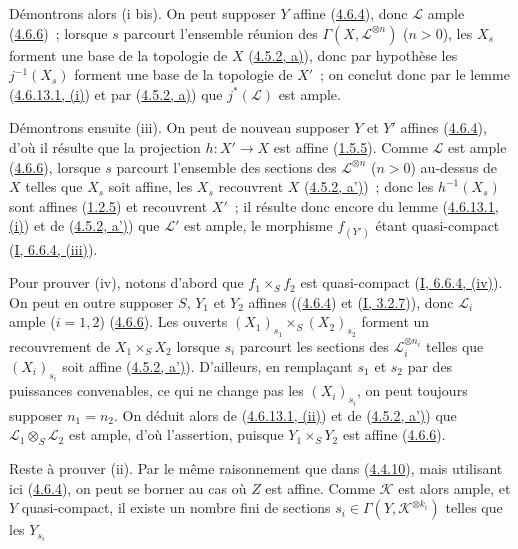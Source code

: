 Démontrons alors (i bis). On peut supposer $Y$ affine
(\hyperref[II.4.6.4-fr]{4.6.4}), donc $\mathcal{L}$ ample
(\hyperref[II.4.6.6-fr]{4.6.6})~; lorsque $s$ parcourt l'ensemble réunion
des $\Gamma(X,\mathcal{L}^{\otimes n})$ ($n>0$), les $X_s$ forment une
base de la topologie de $X$ (\hyperref[II.4.5.2-fr]{4.5.2, a)}), donc par
hypothèse les $j^{-1}(X_s)$ forment une base de la topologie de $X'$~; on
conclut donc par le lemme
(\hyperref[II.4.6.13.1-fr]{4.6.13.1, (i)}) et par
(\hyperref[II.4.5.2-fr]{4.5.2, a)}) que $j^*(\mathcal{L})$ est ample.

Démontrons ensuite (iii). On peut de nouveau supposer $Y$ et $Y'$ affines
(\hyperref[II.4.6.4-fr]{4.6.4}), d'où il résulte que la projection
$h:X'\to X$ est affine (\hyperref[II.1.5.5-fr]{1.5.5}). Comme
$\mathcal{L}$ est ample (\hyperref[II.4.6.6-fr]{4.6.6}), lorsque $s$
parcourt l'ensemble des sections des $\mathcal{L}^{\otimes n}$ ($n>0$)
au-dessus de $X$ telles que $X_s$ soit affine, les $X_s$ recouvrent $X$
(\hyperref[II.4.5.2-fr]{4.5.2, a')})~; donc les $h^{-1}(X_s)$ sont affines
(\hyperref[II.1.2.5-fr]{1.2.5}) et recouvrent $X'$~; il résulte donc encore
du lemme (\hyperref[II.4.6.13.1-fr]{4.6.13.1, (i)}) et de
(\hyperref[II.4.5.2-fr]{4.5.2, a')}) que $\mathcal{L}'$ est ample, le
morphisme $f_{(Y')}$ étant quasi-compact
(\hyperref[I.6.6.4-fr]{I, 6.6.4, (iii)}).

Pour prouver (iv), notons d'abord que $f_1\times_S f_2$ est quasi-compact
(\hyperref[I.6.6.4-fr]{I, 6.6.4, (iv)}). On peut en outre supposer $S$,
$Y_1$ et $Y_2$ affines ((\hyperref[II.4.6.4-fr]{4.6.4}) et
(\hyperref[I.3.2.7-fr]{I, 3.2.7})), donc $\mathcal{L}_i$ ample ($i=1,2$)
(\hyperref[II.4.6.6-fr]{4.6.6}). Les ouverts
$(X_1)_{s_1}\times_S(X_2)_{s_2}$ forment un recouvrement de
$X_1\times_S X_2$ lorsque $s_i$ parcourt les sections des
$\mathcal{L}_i^{\otimes n_i}$ telles que $(X_i)_{s_i}$ soit affine
(\hyperref[II.4.5.2-fr]{4.5.2, a')}). D'ailleurs, en remplaçant $s_1$ et
$s_2$ par des puissances convenables, ce qui ne change pas les
$(X_i)_{s_i}$, on peut toujours supposer $n_1=n_2$. On déduit alors de
(\hyperref[II.4.6.13.1-fr]{4.6.13.1, (ii)}) et de
(\hyperref[II.4.5.2-fr]{4.5.2, a')}) que
$\mathcal{L}_1\otimes_S\mathcal{L}_2$ est ample, d'où l'assertion, puisque
$Y_1\times_S Y_2$ est affine (\hyperref[II.4.6.6-fr]{4.6.6}).

Reste à prouver (ii). Par le même raisonnement que dans
(\hyperref[II.4.4.10-fr]{4.4.10}), mais utilisant ici
(\hyperref[II.4.6.4-fr]{4.6.4}), on peut se borner au cas où $Z$ est
affine. Comme $\mathcal{K}$ est alors ample, et $Y$ quasi-compact, il existe
un nombre fini de sections $s_i\in\Gamma(Y,\mathcal{K}^{\otimes k_i})$
telles que les $Y_{s_i}$

